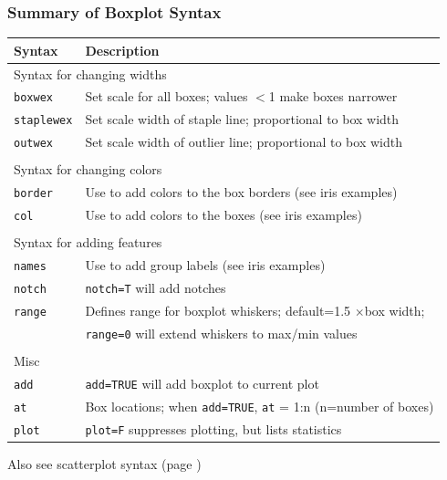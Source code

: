 \documentclass[10pt]{beamer}
\begin{document}
\begin{frame}[fragile]
\frametitle{Summary of Boxplot Syntax}

{\footnotesize
\begin{tabular}{ll}
Syntax                    & Description \\ \hline
\multicolumn{2}{l}{Syntax for changing widths}\\
{\color{red} \tt boxwex}  & Set scale for all boxes; values $<$1 make boxes narrower\\
{\color{red} \tt staplewex} & Set scale width of staple line; proportional to box width\\
{\color{red} \tt outwex}  & Set scale width of outlier line; proportional to box width \\
                          & \\
\multicolumn{2}{l}{Syntax for changing colors}\\
{\color{red} \tt border}  & Use to add colors to the box borders (see iris examples)\\
{\color{red} \tt col}     & Use to add colors to the boxes (see iris examples) \\
                          & \\
\multicolumn{2}{l}{Syntax for adding features}\\
{\color{red} \tt names}   & Use to add group labels (see iris examples)\\
{\color{red} \tt notch}   & {\color{red} \tt notch=T} will add notches\\
{\color{red} \tt range}   & Defines range for boxplot whiskers; default=1.5 $\times$box width;\\
                          & {\color{red} \tt range=0} will extend whiskers to max/min values\\ 
                          & \\
\multicolumn{2}{l}{Misc}\\
{\color{red} \tt add}     & {\color{red} \tt add=TRUE} will add boxplot to current plot\\
{\color{red} \tt at}      & Box locations; when {\color{red} \tt add=TRUE},
                            {\color{red} \tt at} = 1:n (n=number of boxes)\\
{\color{red} \tt plot}    & {\color{red} \tt plot=F} suppresses plotting, but lists statistics\\\hline
\end{tabular}

Also see scatterplot syntax (page \pageref{scatterplotsyntax})

}

\end{frame}
\end{document}
